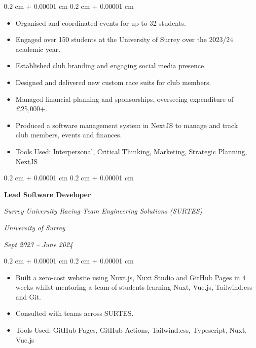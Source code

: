 \documentclass[10pt, letterpaper]{article}
\newenvironment{highlights}{
    \begin{itemize}[
        topsep=0.10 cm,
        parsep=0.10 cm,
        partopsep=0pt,
        itemsep=0pt,
        leftmargin=0.4 cm + 10pt
    ]
}{
    \end{itemize}
} %
\newenvironment{onecolentry}{
    \begin{adjustwidth}{
        0.2 cm + 0.00001 cm
    }{
        0.2 cm + 0.00001 cm
    }
}{
    \end{adjustwidth}
} %
\newenvironment{twocolentry}[2][]{
    \onecolentry
    \def\secondColumn{#2}
    \setcolumnwidth{\fill, 8 cm}
    \begin{paracol}{2}
}{
    \switchcolumn \raggedleft \secondColumn
    \end{paracol}
    \endonecolentry
} %
\begin{document}
        \vspace{0.10 cm}
        \begin{onecolentry}
            \begin{highlights}
                \item Organised and coordinated events for up to 32 students.
                \item Engaged over 150 students at the University of Surrey over the 2023/24 academic year.
                \item Established club branding and engaging social media presence.
                \item Designed and delivered new custom race suits for club members.
                \item Managed financial planning and sponsorships, overseeing expenditure of £25,000+.
                \item Produced a software management system in NextJS to manage and track club members, events and finances.
                \item Tools Used: Interpersonal, Critical Thinking, Marketing, Strategic Planning, NextJS
            \end{highlights}
        \end{onecolentry}


        \vspace{0.2 cm}

        \begin{twocolentry}{
        \textit{University of Surrey}    
            
        \textit{Sept 2023 – June 2024}}
            \textbf{Lead Software Developer}
            
            \textit{Surrey University Racing Team Engineering Solutions (SURTES)}
        \end{twocolentry}

        \vspace{0.10 cm}
        \begin{onecolentry}
            \begin{highlights}
                \item Built a zero-cost website using Nuxt.js, Nuxt Studio and GitHub Pages in 4 weeks whilst mentoring a team of students learning Nuxt, Vue.js, Tailwind.css and Git.
                \item Consulted with teams across SURTES.
                \item Tools Used: GitHub Pages, GitHub Actions, Tailwind.css, Typescript, Nuxt, Vue.js
            \end{highlights}
        \end{onecolentry}
\end{document}
